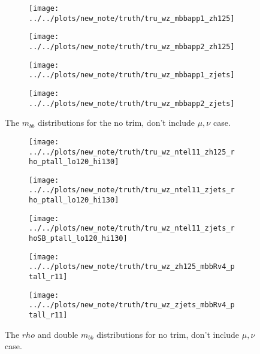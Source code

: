 \begin{figure}[!htbp]\captionsetup{justification=centering}
\begin{center}
\begin{subfigure}[t]{18pc}\centering\texttt{[image: ../../plots/new\_note/truth/tru\_wz\_mbbapp1\_zh125]}\caption{}\end{subfigure}
\begin{subfigure}[t]{18pc}\centering\texttt{[image: ../../plots/new\_note/truth/tru\_wz\_mbbapp2\_zh125]}\caption{}\end{subfigure}
\begin{subfigure}[t]{18pc}\centering\texttt{[image: ../../plots/new\_note/truth/tru\_wz\_mbbapp1\_zjets]}\caption{}\end{subfigure}
\begin{subfigure}[t]{18pc}\centering\texttt{[image: ../../plots/new\_note/truth/tru\_wz\_mbbapp2\_zjets]}\caption{}\end{subfigure}
\caption{\label{fig:mbbwz}The $m_{bb}$ distributions for the no trim, don't include $\mu,\nu$ case.}
\end{center}
\end{figure}
\begin{figure}[!htbp]\captionsetup{justification=centering}
\begin{center}
\begin{subfigure}[t]{18pc}\centering\texttt{[image: ../../plots/new\_note/truth/tru\_wz\_ntel11\_zh125\_rho\_ptall\_lo120\_hi130]}\caption{}\end{subfigure}
\begin{subfigure}[t]{18pc}\centering\texttt{[image: ../../plots/new\_note/truth/tru\_wz\_ntel11\_zjets\_rho\_ptall\_lo120\_hi130]}\caption{}\end{subfigure}
\begin{subfigure}[t]{18pc}\centering\texttt{[image: ../../plots/new\_note/truth/tru\_wz\_ntel11\_zjets\_rhoSB\_ptall\_lo120\_hi130]}\caption{}\end{subfigure}
\begin{subfigure}[t]{18pc}\centering\texttt{[image: ../../plots/new\_note/truth/tru\_wz\_zh125\_mbbRv4\_ptall\_r11]}\caption{}\end{subfigure}
\begin{subfigure}[t]{18pc}\centering\texttt{[image: ../../plots/new\_note/truth/tru\_wz\_zjets\_mbbRv4\_ptall\_r11]}\caption{}\end{subfigure}
\caption{\label{fig:mbbwz}The $rho$ and double $m_{bb}$ distributions for no trim, don't include $\mu,\nu$ case.}
\end{center}
\end{figure}
